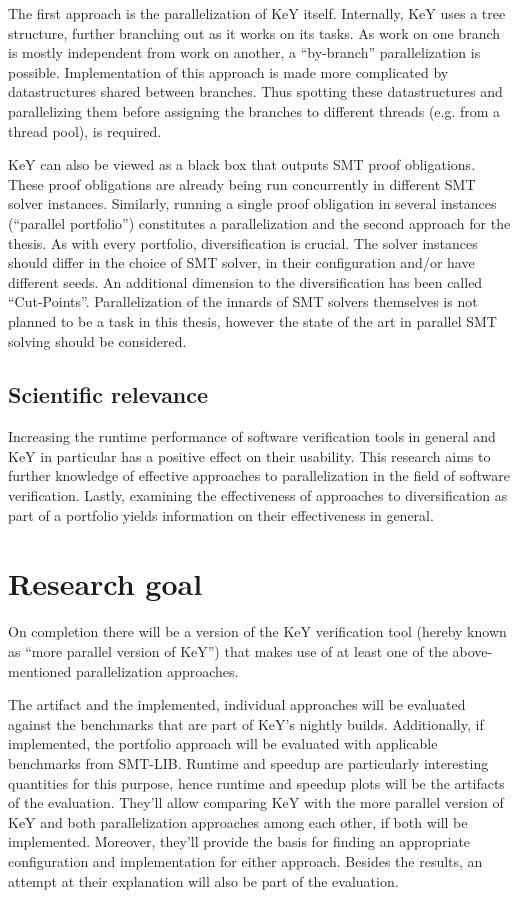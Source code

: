 \documentclass{scrartcl}
\begin{document}
The first approach is the parallelization of KeY itself.
Internally, KeY uses a tree structure, further branching out as it works on its tasks.
As work on one branch is mostly independent from work on another,
a \enquote{by-branch} parallelization is possible.
Implementation of this approach is made more complicated
by datastructures shared between branches.
Thus spotting these datastructures and parallelizing them
before assigning the branches to different threads (e.g. from a thread pool),
is required.

KeY can also be viewed as a black box that outputs SMT proof obligations.
These proof obligations are already being run concurrently in different SMT solver instances.
Similarly, running a single proof obligation in several instances (\enquote{parallel portfolio})
constitutes a parallelization and the second approach for the thesis.
As with every portfolio, diversification is crucial.
The solver instances should differ in the choice of SMT solver,
in their configuration and/or have different seeds.
An additional dimension to the diversification has been called \enquote{Cut-Points}.
Parallelization of the innards of SMT solvers themselves is not planned to be a task in this thesis,
however the state of the art in parallel SMT solving should be considered.

\subsection{Scientific relevance}
Increasing the runtime performance of software verification tools in general and KeY in particular
has a positive effect on their usability.
This research aims to further knowledge of effective approaches to parallelization
in the field of software verification.
Lastly, examining the effectiveness of approaches to diversification as part of a portfolio
yields information on their effectiveness in general.

\section{Research goal}
On completion there will be a version of the KeY verification tool
(hereby known as \enquote{more parallel version of KeY})
that makes use of at least one of the above-mentioned parallelization approaches.

The artifact and the implemented, individual approaches will be evaluated
against the benchmarks that are part of KeY's nightly builds.
Additionally, if implemented,
the portfolio approach will be evaluated with applicable benchmarks from SMT-LIB.
Runtime and speedup are particularly interesting quantities for this purpose,
hence runtime and speedup plots will be the artifacts of the evaluation.
They'll allow comparing KeY with the more parallel version of KeY and
both parallelization approaches among each other, if both will be implemented.
Moreover, they'll provide the basis for finding an appropriate configuration
and implementation for either approach.
Besides the results, an attempt at their explanation will also be part of the evaluation.
\end{document}
